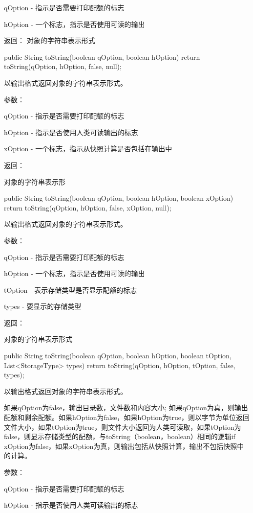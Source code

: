 \begin{java}
qOption - 指示是否需要打印配额的标志

hOption - 一个标志，指示是否使用可读的输出


返回：
对象的字符串表示形式
\begin{java}
public String toString(boolean qOption, boolean hOption) {
  return toString(qOption, hOption, false, null);
}
\end{java}
以输出格式返回对象的字符串表示形式。

参数：

qOption - 指示是否需要打印配额的标志

hOption - 指示是否使用人类可读输出的标志

xOption - 一个标志，指示从快照计算是否包括在输出中

返回：

对象的字符串表示形
\begin{java}
public String toString(boolean qOption, boolean hOption, boolean xOption) {
  return toString(qOption, hOption, false, xOption, null);
}
\end{java}
以输出格式返回对象的字符串表示形式。

参数：

qOption - 指示是否需要打印配额的标志

hOption - 一个标志，指示是否使用可读的输出

tOption - 表示存储类型是否显示配额的标志

types - 要显示的存储类型

返回：

对象的字符串表示形式

\begin{java}
public String toString(boolean qOption, boolean hOption,
                       boolean tOption, List<StorageType> types) {
  return toString(qOption, hOption, tOption, false, types);
}
\end{java}
以输出格式返回对象的字符串表示形式。

如果qOption为false，输出目录数，文件数和内容大小; 如果qOption为真，则输出配额和剩余配额。如果hOption为false，如果hOption为true，则以字节为单位返回文件大小，如果tOption为true，则文件大小返回为人类可读取，如果tOption为false，则显示存储类型的配额，与toString（boolean，boolean）相同的逻辑if xOption为false，如果xOption为真，则输出包括从快照计算，输出不包括快照中的计算。

参数：

qOption - 指示是否需要打印配额的标志

hOption - 指示是否使用人类可读输出的标志


\end{java}

